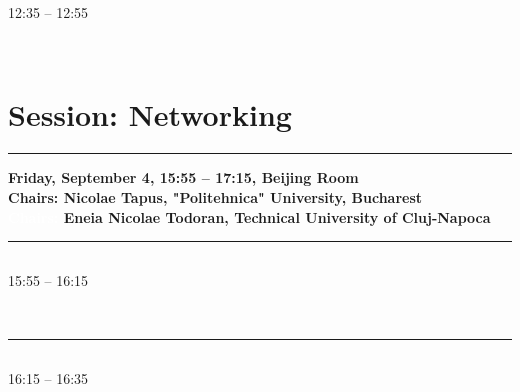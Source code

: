 	    12:35 -- 12:55 \nopagebreak

            
            \\ 

            



\section{{\bf \large Session: %
Networking
}} \vspace{-15pt} %
\noindent\rule{\textwidth}{0.4pt} \nopagebreak
{\bf  
Friday, September 4, 15:55 -- 17:15, Beijing Room
} \\ \nopagebreak
{\bf  Chairs: 
Nicolae Tapus, "Politehnica" University, Bucharest
} \\ \nopagebreak 
{\bf  \textcolor{white}{Chairs:} 
Eneia Nicolae Todoran, Technical University of Cluj-Napoca
} \\ \nopagebreak 
\noindent\rule{\textwidth}{0.4pt} \nopagebreak

\vspace*{-36pt}\subsection[ 
    	   {\bf A comparison between Extreme Learning Machine, Support Vector Machine classifiers
           } \\
           {\it Mihai Bucurica, Radu Dogaru, Ioana Dogaru
           }
	]
	    {
            }
	    15:55 -- 16:15 \nopagebreak

            
            \\ 
            \noindent\rule{\textwidth}{0.4pt}
\vspace*{-36pt}\subsection[ 
    	   {\bf Immune System Modeling and Analysis using Bio-PEPA
           } \\
           {\it Roxana Moldovan, Eneia Nicolae Todoran
           }
	]
	    {
            }
	    16:15 -- 16:35 \nopagebreak

